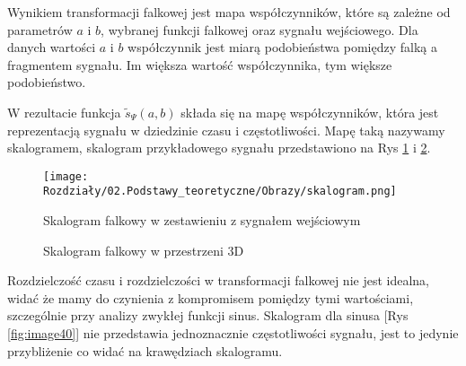 Wynikiem transformacji falkowej jest mapa współczynników, które są zależne od parametrów $a$ i $b$, wybranej funkcji falkowej oraz sygnału wejściowego. Dla danych wartości $a$ i $b$ współczynnik jest miarą podobieństwa pomiędzy falką a fragmentem sygnału. Im większa wartość współczynnika, tym większe podobieństwo.


W rezultacie funkcja $ \tilde{s}_{\Psi}\left(a,b\right)$ składa się na mapę współczynników, która jest reprezentacją sygnału w dziedzinie czasu i częstotliwości. Mapę taką nazywamy skalogramem, skalogram przykładowego sygnału przedstawiono na Rys \ref{fig:image38} i \ref{fig:image39}.

\begin{figure}[ht]
    \centering
    \begin{minipage}[t]{0.9\linewidth}
        \texttt{[image: Rozdziały/02.Podstawy\_teoretyczne/Obrazy/skalogram.png]}
        \caption{Skalogram falkowy w zestawieniu z sygnałem wejściowym}
        \label{fig:image38}
    \end{minipage}
\end{figure}

\begin{figure}[ht]
    \centering
    \caption{Skalogram falkowy w przestrzeni 3D}
    \label{fig:image39}
\end{figure}

Rozdzielczość czasu i rozdzielczości w transformacji falkowej nie jest idealna, widać że mamy do czynienia z kompromisem pomiędzy tymi wartościami, szczególnie przy analizy zwykłej funkcji sinus. Skalogram dla sinusa [Rys \ref{fig:image40}] nie przedstawia jednoznacznie częstotliwości sygnału, jest to jedynie przybliżenie co widać na krawędziach skalogramu.

